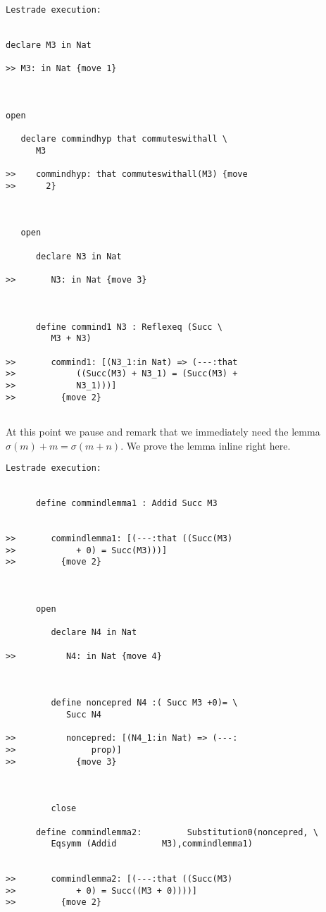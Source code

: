 \documentclass[12pt]{article}
\begin{document}
\begin{verbatim}Lestrade execution:


declare M3 in Nat

>> M3: in Nat {move 1}



open

   declare commindhyp that commuteswithall \
      M3

>>    commindhyp: that commuteswithall(M3) {move
>>      2}



   open

      declare N3 in Nat

>>       N3: in Nat {move 3}



      define commind1 N3 : Reflexeq (Succ \
         M3 + N3)

>>       commind1: [(N3_1:in Nat) => (---:that
>>            ((Succ(M3) + N3_1) = (Succ(M3) +
>>            N3_1)))]
>>         {move 2}


\end{verbatim}

At this point we pause and remark that we immediately need the lemma $\sigma(m)+m = \sigma(m+n)$.  We prove the lemma inline right here.

\begin{verbatim}Lestrade execution:


      define commindlemma1 : Addid Succ M3


>>       commindlemma1: [(---:that ((Succ(M3)
>>            + 0) = Succ(M3)))]
>>         {move 2}



      open

         declare N4 in Nat

>>          N4: in Nat {move 4}



         define noncepred N4 :( Succ M3 +0)= \
            Succ N4

>>          noncepred: [(N4_1:in Nat) => (---:
>>               prop)]
>>            {move 3}



         close

      define commindlemma2:         Substitution0(noncepred, \
         Eqsymm (Addid         M3),commindlemma1)


>>       commindlemma2: [(---:that ((Succ(M3)
>>            + 0) = Succ((M3 + 0))))]
>>         {move 2}


\end{verbatim}
\end{document}
